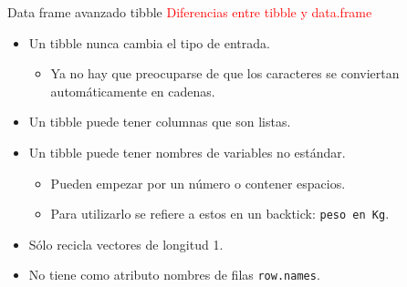 \documentclass[
  ignorenonframetext,
  aspectratio=169]{beamer}
\providecommand{\tightlist}{%
  \setlength{\itemsep}{0pt}\setlength{\parskip}{0pt}}
\newcommand\red[1]{\textcolor{red}{#1}}
\begin{document}
\begin{frame}[fragile]{Data frame avanzado tibble}
\protect\hypertarget{data-frame-avanzado-tibble-4}{}
\red{Diferencias entre tibble y data.frame}

\begin{itemize}
\item
  Un tibble nunca cambia el tipo de entrada.

  \begin{itemize}
  \tightlist
  \item
    Ya no hay que preocuparse de que los caracteres se conviertan
    automáticamente en cadenas.
  \end{itemize}
\item
  Un tibble puede tener columnas que son listas.
\item
  Un tibble puede tener nombres de variables no estándar.

  \begin{itemize}
  \tightlist
  \item
    Pueden empezar por un número o contener espacios.
  \item
    Para utilizarlo se refiere a estos en un backtick:
    \texttt{peso\ en\ Kg}.
  \end{itemize}
\item
  Sólo recicla vectores de longitud 1.
\item
  No tiene como atributo nombres de filas \texttt{row.names}.
\end{itemize}
\end{frame}
\end{document}
